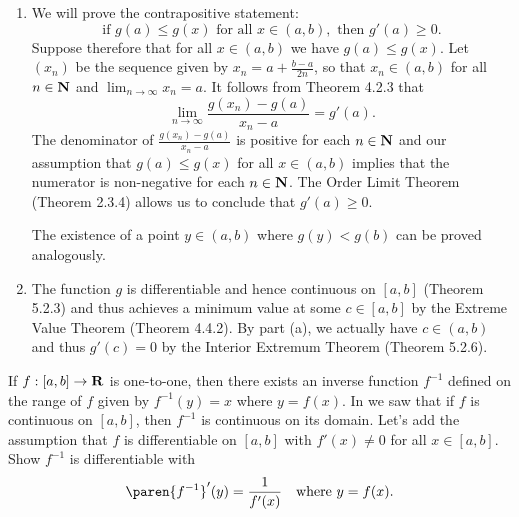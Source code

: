 \documentclass{lew98_solutions}
\begin{document}
\begin{solution}
    \begin{enumerate}
        \item We will prove the contrapositive statement:
        \[
            \text{if } g(a) \leq g(x) \text{ for all } x \in (a, b), \text{ then } g'(a) \geq 0.
        \]
        Suppose therefore that for all \( x \in (a, b) \) we have \( g(a) \leq g(x) \). Let \( (x_n) \) be the sequence given by \( x_n = a + \tfrac{b - a}{2n} \), so that \( x_n \in (a, b) \) for all \( n \in \mathbf{N} \) and \( \lim_{n \to \infty} x_n = a \). It follows from Theorem 4.2.3 that
        \[
            \lim_{n \to \infty} \frac{g(x_n) - g(a)}{x_n - a} = g'(a).
        \]
        The denominator of \( \tfrac{g(x_n) - g(a)}{x_n - a} \) is positive for each \( n \in \mathbf{N} \) and our assumption that \( g(a) \leq g(x) \) for all \( x \in (a, b) \) implies that the numerator is non-negative for each \( n \in \mathbf{N} \). The Order Limit Theorem (Theorem 2.3.4) allows us to conclude that \( g'(a) \geq 0 \).

        The existence of a point \( y \in (a, b) \) where \( g(y) < g(b) \) can be proved analogously.

        \item The function \( g \) is differentiable and hence continuous on \( [a, b] \) (Theorem 5.2.3) and thus achieves a minimum value at some \( c \in [a, b] \) by the Extreme Value Theorem (Theorem 4.4.2). By part (a), we actually have \( c \in (a, b) \) and thus \( g'(c) = 0 \) by the Interior Extremum Theorem (Theorem 5.2.6).
    \end{enumerate}
\end{solution}

\begin{exercise}
\label{ex:5.2.12}
    If \( f : [a, b] \to \mathbf{R} \) is one-to-one, then there exists an inverse function \( f^{-1} \) defined on the range of \( f \) given by \( f^{-1}(y) = x \) where \( y = f(x) \). In  we saw that if \( f \) is continuous on \( [a, b] \), then \( f^{-1} \) is continuous on its domain. Let's add the assumption that \( f \) is differentiable on \( [a, b] \) with \( f'(x) \neq 0 \) for all \( x \in [a, b] \). Show \( f^{-1} \) is differentiable with
    \[
        \paren{f^{-1}}'(y) = \frac{1}{f'(x)} \quad \text{where } y = f(x).
    \]
\end{exercise}
\end{document}
